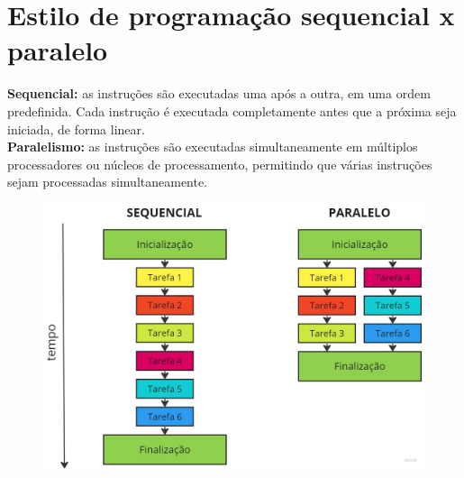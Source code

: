 \documentclass{beamer}
\begin{document}
	\section{Estilo de programação sequencial x paralelo}
 	\textbf{Sequencial:} as instruções são executadas uma após a outra, em uma ordem predefinida. Cada instrução é executada completamente antes que a próxima seja iniciada, de forma linear. \\
	\textbf{Paralelismo:} as instruções são executadas simultaneamente em múltiplos processadores ou núcleos de processamento, permitindo que várias instruções sejam processadas simultaneamente.
	\begin{figure}
 	 \centering
 	 \includegraphics[scale=0.2]{figuras/sequencial_paralelo.jpg}
	\end{figure}
	\newpage

%
%
%
%

%
%
%
%
%		
\end{document}
